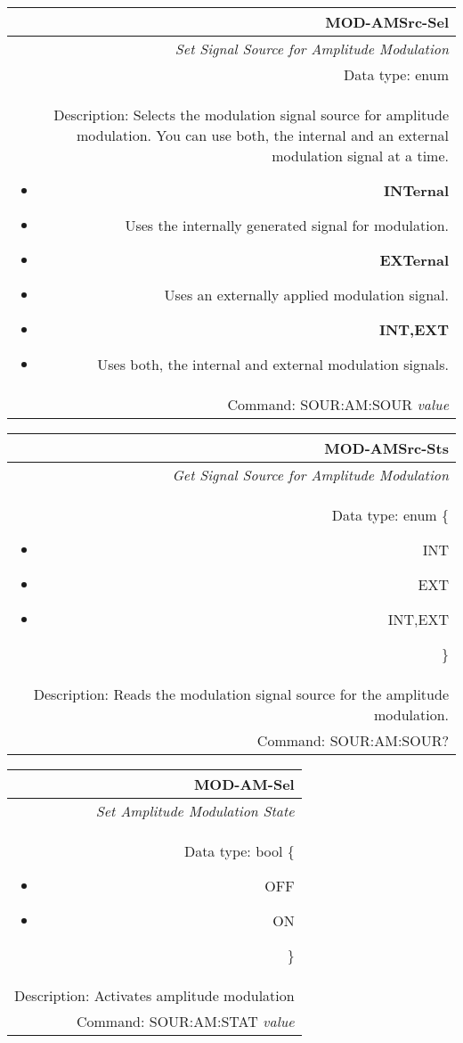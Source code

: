 \documentclass[openany]{article}
\begin{document}
%
		\begin{tabular}{N}
			\hline
			\bfseries MOD-AMSrc-Sel \\ \hline
			\emph{Set Signal Source for Amplitude Modulation} \\
			Data type: enum \\  
			Description: Selects the modulation signal source for amplitude modulation. You can use both, the internal and an external modulation signal at a time.\begin{itemize}[noitemsep]
				\small
				\item[] \textbf{INTernal} 
				\item[]	Uses the internally generated signal for modulation.
				\item[] \textbf{EXTernal}
				\item[] Uses an externally applied modulation signal.
				\item[] \textbf{INT,EXT}
				\item[] Uses both, the internal and external modulation signals.
			\end{itemize} \\
			Command: SOUR:AM:SOUR \emph{value} \\

		\end{tabular}


		\begin{tabular}{N}
			\hline
			\bfseries MOD-AMSrc-Sts \\ \hline
			\emph{Get Signal Source for Amplitude Modulation} \\
			Data type: enum \{\begin{itemize}[noitemsep]
				\small
				\item[] INT
				\item[] EXT
				\item[] INT,EXT
			\end{itemize}\} \\ 
			Description: Reads the modulation signal source for the amplitude modulation. \\
			Command: SOUR:AM:SOUR? \\

		\end{tabular}
%
		\begin{tabular}{N}
			\hline
			\bfseries MOD-AM-Sel \\ \hline
			\emph{Set Amplitude Modulation State} \\
			Data type: bool \{\begin{itemize}[noitemsep]
				\small
				\item[] OFF
				\item[] ON
			\end{itemize}\} \\
			Description: Activates amplitude modulation\\
			Command: SOUR:AM:STAT \emph{value} \\

		\end{tabular}
\end{document}
